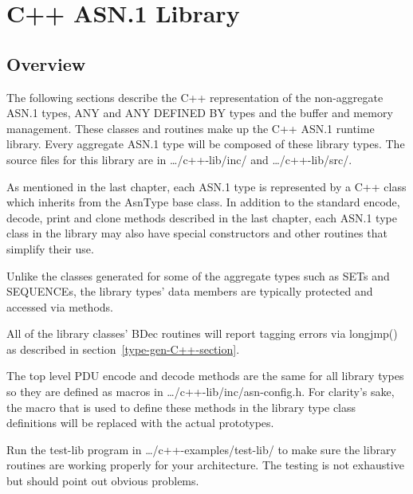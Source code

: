 
%
%
%

\chapter{\label{lib-C++-chapter}C++ ASN.1 Library}
\section{\label{libover-C++-section}Overview}

The following sections describe the C++ representation of the
non-aggregate ASN.1 types, ANY and ANY DEFINED BY types and
the buffer and memory management.  These classes and routines make
up the C++ ASN.1 runtime library. Every aggregate ASN.1 type will be
composed of these library types. The source files for this library
are in {\ufn \dots/c++-lib/inc/} and {\ufn \dots/c++-lib/src/}.

As mentioned in the last chapter, each ASN.1 type is represented by a
C++ class which inherits from the {\C AsnType} base class.  In
addition to the standard encode, decode, print and clone methods
described in the last chapter, each ASN.1 type class in the library
may also have special constructors and other routines that simplify
their use.

Unlike the classes generated for some of the aggregate types such as
SETs and SEQUENCEs, the library types' data members are typically
protected and accessed via methods.

All of the library classes' {\C BDec} routines will report tagging errors
via {\C longjmp()} as described in section~\ref{type-gen-C++-section}.

The top level PDU encode and decode methods are the same for all
library types so they are defined as macros in
{\ufn \dots/c++-lib/inc/asn-config.h}. For clarity's sake, the macro
that is used to define these methods in the library type class
definitions will be replaced with the actual prototypes.

Run the {\ufn test-lib} program in {\ufn \dots/c++-examples/test-lib/}
to make sure the library routines are working properly for your
architecture.  The testing is not exhaustive but should point out
obvious problems.


